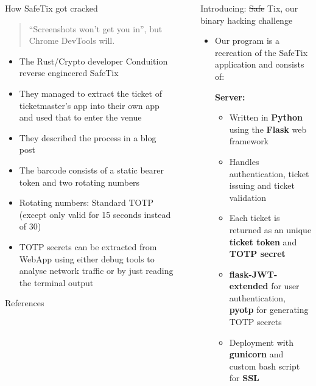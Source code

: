 \documentclass[final,dvipsnames]{beamer}
\newcommand{\soutthick}[1]{%
    \renewcommand{\ULthickness}{4pt}%
       \sout{#1}%
    \renewcommand{\ULthickness}{.4pt}%
}
\newlength{\sepwidth}
\newlength{\colwidth}
\newcommand{\separatorcolumn}{\begin{column}{\sepwidth}\end{column}}
\begin{document}
\begin{frame}[t, fragile]
\begin{columns}[t]
\begin{column}{\colwidth}
    \begin{block}{How SafeTix got cracked}
        \begin{quotation}
            “Screenshots won’t get you in”, but Chrome DevTools will.
        \end{quotation}
        \begin{itemize}
            \item The Rust/Crypto developer Conduition reverse engineered SafeTix \cite{conduition}
            \item They managed to extract the ticket of ticketmaster's app into their own app and used that to enter the venue
            \item They described the process in a blog post \cite{reverse_engineering_ticketmaster}
            \item The barcode consists of a static bearer token and two rotating numbers \cite{reverse_engineering_ticketmaster}
            \item Rotating numbers: Standard TOTP (except only valid for 15 seconds instead of 30)
            \item TOTP secrets can be extracted from WebApp using either debug tools to analyse network traffic or by just reading the terminal output
        \end{itemize}
    \end{block}

    \begin{block}{References}
		\footnotesize{}
	\end{block}

\end{column}

\separatorcolumn

\begin{column}{\colwidth}

    \begin{block}{Introducing: \soutthick{Safe}Tix, our binary hacking challenge}

		\begin{itemize}
			\item Our program is a recreation of the SafeTix application and consists of:
            
            \textbf{Server:}
            \begin{itemize}
                \item Written in \textbf{Python} using the \textbf{Flask} web framework
                \item Handles authentication, ticket issuing and ticket validation
                \item Each ticket is returned as an unique \textbf{ticket token} and \textbf{TOTP secret}
                \item \textbf{flask-JWT-extended} for user authentication, \textbf{pyotp} for generating TOTP secrets
                \item Deployment with \textbf{gunicorn} and custom bash script for \textbf{SSL}
            \end{itemize}
        

\end{itemize}
\end{block}
\end{column}
\end{columns}
\end{frame}
\end{document}

